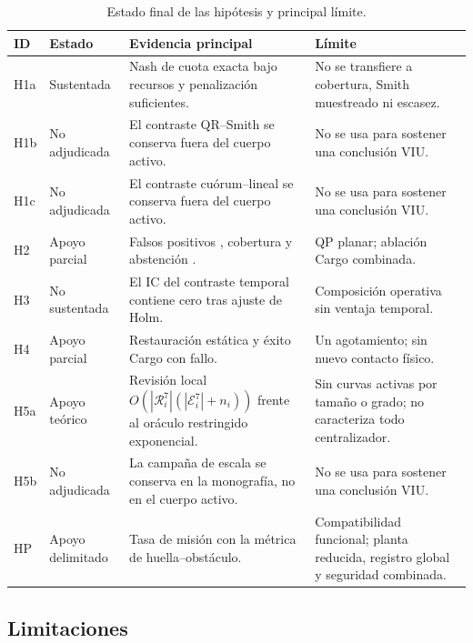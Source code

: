 \begin{table}[H]
  \centering
  \caption{Estado final de las hipótesis y principal límite.}
  \label{tab:conclusion-hypotheses}
  \scriptsize
  \setlength{\tabcolsep}{3pt}
  \begin{tabularx}{\textwidth}{@{}p{0.8cm}p{1.75cm}p{5.1cm}X@{}}
    \toprule
    ID & Estado & Evidencia principal & Límite \\
    \midrule
    H1a & Sustentada & Nash de cuota exacta bajo recursos y penalización suficientes. & No se transfiere a cobertura, Smith muestreado ni escasez. \\
    H1b & No adjudicada & El contraste QR--Smith se conserva fuera del cuerpo activo. & No se usa para sostener una conclusión VIU. \\
    H1c & No adjudicada & El contraste cuórum--lineal se conserva fuera del cuerpo activo. & No se usa para sostener una conclusión VIU. \\
    H2 & Apoyo parcial & Falsos positivos \SPThreeGuardEffect{}, cobertura \SPThreeGuardedCoverage{} y abstención \SPThreeGuardedAbstention{}. & QP planar; ablación Cargo combinada. \\
    H3 & No sustentada & El IC del contraste temporal contiene cero tras ajuste de Holm. & Composición operativa sin ventaja temporal. \\
    H4 & Apoyo parcial & Restauración estática \SPSixConditionalRestore{} y éxito Cargo \CargoEtwoEFailureSuccess{} con fallo. & Un agotamiento; sin nuevo contacto físico. \\
    H5a & Apoyo teórico & Revisión local $O(|\mathcal R_i^7|(|\mathcal E_i^7|+n_i))$ frente al oráculo restringido exponencial. & Sin curvas activas por tamaño o grado; no caracteriza todo centralizador. \\
    H5b & No adjudicada & La campaña de escala se conserva en la monografía, no en el cuerpo activo. & No se usa para sostener una conclusión VIU. \\
    HP & Apoyo delimitado & Tasa de misión \CargoEtwoESuccess{} con la métrica de huella--obstáculo. & Compatibilidad funcional; planta reducida, registro global y seguridad combinada. \\
    \bottomrule
  \end{tabularx}
  \viuownsource
\end{table}

\subsection{Limitaciones}


